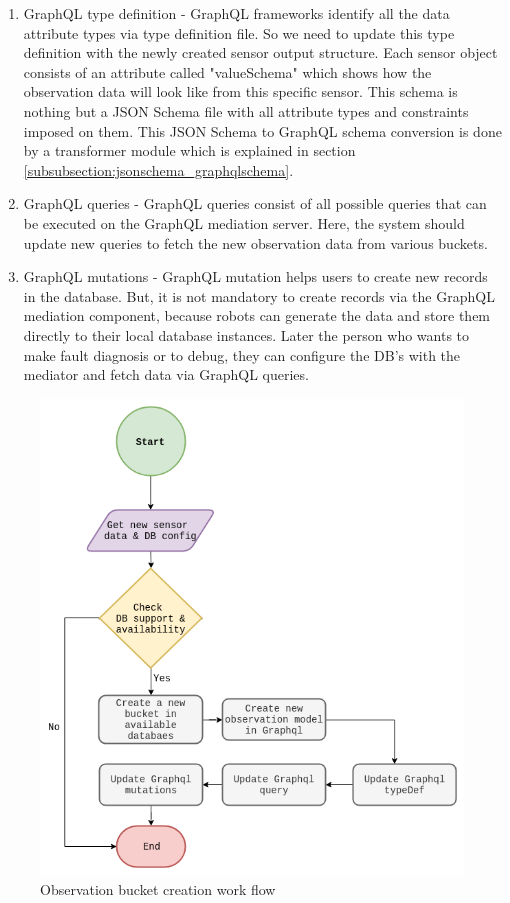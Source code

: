 	\begin{enumerate}
		\item GraphQL type definition - GraphQL frameworks identify all the data attribute types via type definition file. So we need to update this type definition with the newly created sensor output structure. Each sensor object consists of an attribute called "valueSchema" which shows how the observation data will look like from this specific sensor. This schema is nothing but a JSON Schema file with all attribute types and constraints imposed on them. This JSON Schema to GraphQL schema conversion is done by a transformer module which is explained in section \ref{subsubsection:jsonschema_graphqlschema}.
		
		\item GraphQL queries - GraphQL queries consist of all possible queries that can be executed on the GraphQL mediation server. Here, the system should update new queries to fetch the new observation data from various buckets.
		
		\item GraphQL mutations - GraphQL mutation helps users to create new records in the database. But, it is not mandatory to create records via the GraphQL mediation component, because robots can generate the data and store them directly to their local database instances. Later the person who wants to make fault diagnosis or to debug, they can configure the DB's with the mediator and fetch data via GraphQL queries.
	\end{enumerate}
	\newpage
	\begin{figure}[!htbp] 
		\begin{center}
			\includegraphics[scale=0.5]{./images/png/implementation/observation_creation}	
			\caption{Observation bucket creation work flow}	
			\label{fig:observation_creation}	
		\end{center}
	\end{figure}
	
